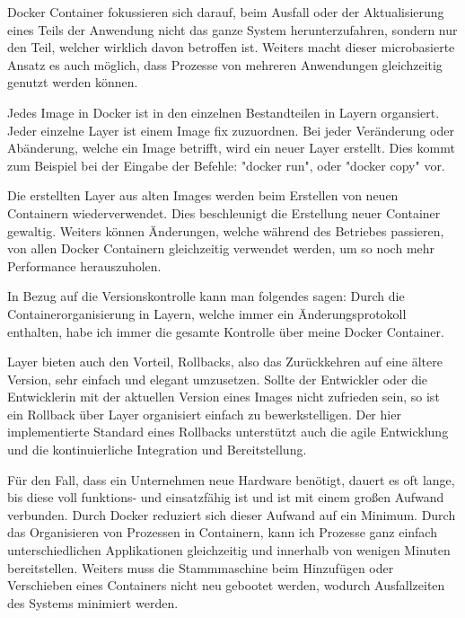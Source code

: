 

Docker Container fokussieren sich darauf, beim Ausfall oder der Aktualisierung eines Teils der Anwendung nicht das ganze System herunterzufahren, sondern nur den Teil, welcher wirklich davon betroffen ist. Weiters macht dieser microbasierte Ansatz es auch möglich, dass Prozesse von mehreren Anwendungen gleichzeitig genutzt werden können. \cite{DockerGrundlagen}


Jedes Image in Docker ist in den einzelnen Bestandteilen in Layern organsiert. Jeder einzelne Layer ist einem Image fix zuzuordnen. Bei jeder Veränderung oder Abänderung, welche ein Image betrifft, wird ein neuer Layer erstellt. Dies kommt zum Beispiel bei der Eingabe der Befehle: "docker run", oder "docker copy" vor. \cite{DockerGrundlagen}

Die erstellten Layer aus alten Images werden beim Erstellen von neuen Containern wiederverwendet. Dies beschleunigt die Erstellung neuer Container gewaltig. Weiters können Änderungen, welche während des Betriebes passieren, von allen Docker Containern gleichzeitig verwendet werden, um so noch mehr Performance herauszuholen. \cite{DockerGrundlagen}

In Bezug auf die Versionskontrolle kann man folgendes sagen: Durch die Containerorganisierung in Layern, welche immer ein Änderungsprotokoll enthalten, habe ich immer die gesamte Kontrolle über meine Docker Container. \cite{DockerGrundlagen}


Layer bieten auch den Vorteil, Rollbacks, also das Zurückkehren auf eine ältere Version, sehr einfach und elegant umzusetzen. Sollte der Entwickler oder die Entwicklerin mit der aktuellen Version eines Images nicht zufrieden sein, so ist ein Rollback über Layer organisiert einfach zu bewerkstelligen. Der hier implementierte Standard eines Rollbacks unterstützt auch die agile Entwicklung und die kontinuierliche Integration und Bereitstellung. \cite{DockerGrundlagen}


Für den Fall, dass ein Unternehmen neue Hardware benötigt, dauert es oft lange, bis diese voll funktions- und einsatzfähig ist und ist mit einem großen Aufwand verbunden. Durch Docker reduziert sich dieser Aufwand auf ein Minimum. Durch das Organisieren von Prozessen in Containern, kann ich Prozesse ganz einfach unterschiedlichen Applikationen gleichzeitig und innerhalb von wenigen Minuten bereitstellen. Weiters muss die Stammmaschine beim Hinzufügen oder Verschieben eines Containers nicht neu gebootet werden, wodurch Ausfallzeiten des Systems minimiert werden. \cite{DockerGrundlagen}
